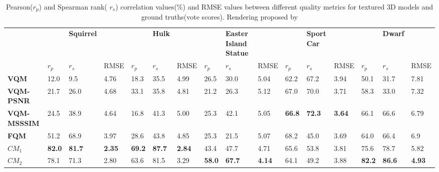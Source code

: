 \begin{table}[]
\centering
\caption{Pearson($r_p$) and Spearman rank( $r_s$) correlation values(\%) and RMSE values between different quality metrics for textured 3D models and ground truths(vote scores). Rendering proposed by}
\label{my-label}
\begin{tabular}{llllllllllllllll}
                    &      & \textbf{Squirrel} & \textbf{} & \textbf{} & \textbf{Hulk} & \textbf{} & \textbf{} & \textbf{Easter Island Statue} & \textbf{} & \textbf{} & \textbf{Sport Car} & \textbf{} & \textbf{} & \textbf{Dwarf} &      \\
                     & $r_p$                & $r_s$           & RMSE & $r_p$                & $r_s$            & RMSE & $r_p$                & $r_s$            & RMSE &$r_p$                & $r_s$            & RMSE      & $r_p$                & $r_s$             & RMSE \\
\textbf{VQM}        & 12.0          & 9.5               & 4.76          & 18.3          & 35.5          & 4.99          & 26.5          & 30.0                          & 5.04          & 62.2          & 67.2               & 3.94          & 50.1          & 31.7           & 7.81          \\
\textbf{VQM-PSNR}   & 21.7          & 26.0              & 4.68          & 33.1          & 35.8          & 4.81          & 21.2          & 26.3                          & 5.12          & 67.0          & 70.0               & 3.71          & 58.3          & 33.0           & 7.32          \\
\textbf{VQM-MSSSIM} & 24.5          & 38.9              & 4.64          & 16.8          & 41.3          & 5.00          & 25.3          & 42.1                          & 5.05          & \textbf{66.8} & \textbf{72.3}      & \textbf{3.64} & 66.1          & 66.6           & 6.79          \\
\textbf{FQM}        & 51.2          & 68.9              & 3.97          & 28.6          & 43.8          & 4.85          & 25.3          & 21.5                          & 5.07          & 68.2          & 45.0               & 3.69          & 64.0          & 66.4           & 6.9           \\
$CM_1$                 & \textbf{82.0} & \textbf{81.7}     & \textbf{2.35} & \textbf{69.2} & \textbf{87.7} & \textbf{2.84} & 43.4          & 47.7                          & 4.71          & 65.6          & 53.8               & 3.81          & 75.6          & 78.7           & 5.82          \\
$CM_2$                 & 78.1          & 71.3              & 2.80          & 63.6          & 81.5          & 3.29          & \textbf{58.0} & \textbf{67.7}                 & \textbf{4.14} & 64.1          & 49.2               & 3.88          & \textbf{82.2} & \textbf{86.6}  & \textbf{4.93}
\end{tabular}
\end{table}
